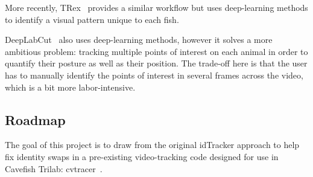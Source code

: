 \documentclass{article}
\newcommand{\yf}[1]{{\color{darkRed}{#1}}}
\begin{document}
More recently, TRex~\cite{walter_trex_2021} provides a similar workflow but uses deep-learning methods to identify a visual pattern unique to each fish.

DeepLabCut~\cite{mathis_deeplabcut_2018} also uses deep-learning methods, however it solves a more ambitious problem: tracking multiple points of interest on each animal in order to quantify their posture as well as their position. The trade-off here is that the user has to manually identify the points of interest in several frames across the video, which is a bit more labor-intensive.

\subsection{Roadmap}

The goal of this project is to draw from the original idTracker approach to help fix identity swaps in a pre-existing video-tracking code designed for use in Cavefish Trilab: cvtracer~\cite{patch_kinematic_2020, patch_patchmemorycvtracer_2020}.

\yf{[Give a brief overview what's covered in each section of the thesis]}


\end{document}
